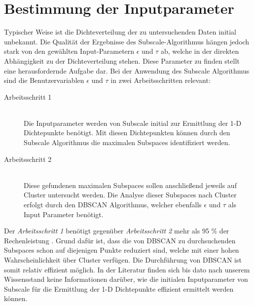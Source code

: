 \documentclass[utf8,biblatex]{lni}
\begin{document}
\section{Bestimmung der Inputparameter}
Typischer Weise ist die Dichteverteilung der zu untersuchenden Daten
initial unbekannt.
Die Qualität der Ergebnisse des Subscale-Algorithmus hängen jedoch
stark von den gewählten Input-Parametern $\epsilon$ und $\tau$ ab,
welche in der direkten Abhängigkeit zu der Dichteverteilung stehen.
Diese Parameter zu finden stellt eine herausfordernde Aufgabe dar.
Bei der Anwendung des Subscale Algorithmus sind die Benutzervariablen $\epsilon$ und $\tau$ in zwei Arbeitsschritten relevant:
\begin{description}
\item[Arbeitsschritt 1]\hfill \\
Die Inputparameter werden von Subscale initial zur Ermittlung der 1-D Dichtepunkte benötigt.
Mit diesen Dichtepunkten können durch den Subscale Algorithmus die maximalen Subspaces identifiziert werden.
\item[Arbeitsschritt 2]\hfill \\
  Diese gefundenen maximalen Subspaces sollen anschließend jeweils auf Cluster untersucht werden.
  Die Analyse dieser Subspaces nach Cluster erfolgt durch den DBSCAN Algorithmus, welcher ebenfalls $\epsilon$ und $\tau$
  als Input Parameter benötigt.
\end{description}
Der \emph{Arbeitsschritt 1} benötigt gegenüber \emph{Arbeitsschritt 2} mehr als 95 \% der Rechenleistung \Cite{JournalArticel}.
Grund dafür ist, dass die von DBSCAN zu durchsuchenden Subspaces schon auf diejenigen Punkte reduziert sind,
welche mit einer hohen Wahrscheinlichkeit über Cluster verfügen.
Die Durchführung von DBSCAN ist somit relativ effizient möglich.
In der Literatur finden sich bis dato nach unserem Wissensstand keine Informationen darüber,
wie die initialen Inputparameter von Subscale für die Ermittlung der 1-D Dichtepunkte effizient ermittelt werden können.
\end{document}
